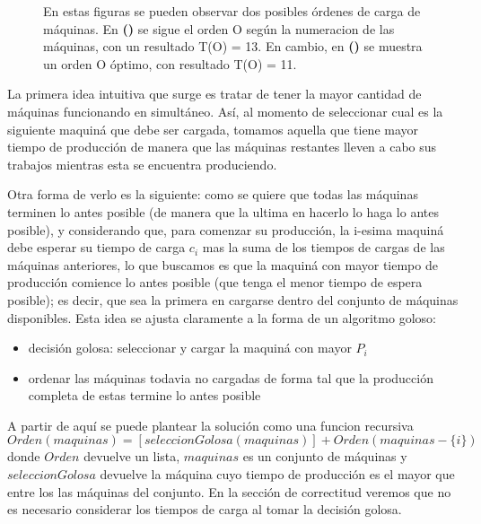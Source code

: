 \begin{figure}
\begin{center}
\begin{minipage}[c]{\figurewidth}
\begin{center}
             \caption{En estas figuras se pueden observar dos posibles \'ordenes de carga de m\'aquinas. En \textbf{()} se
             					sigue el orden O seg\'un la numeracion de las m\'aquinas, con un resultado T(O) = 13. En cambio, en \textbf{()} 
             					se muestra un orden O \'optimo, con resultado T(O) = 11.
             					}   
             \label{fig:ej1Ejemplos}
            \end{center}
        \end{minipage}
    \end{center}
\end{figure}
 
 
La primera idea intuitiva que surge es tratar de tener la mayor cantidad de m\'aquinas funcionando en simult\'aneo.
As\'i, al momento de seleccionar cual es la siguiente maquin\'a que debe ser cargada, 
tomamos aquella que tiene mayor tiempo de producci\'on de manera
que las m\'aquinas restantes lleven a cabo sus trabajos mientras esta se encuentra produciendo.

Otra forma de verlo es la siguiente: como se quiere que todas las m\'aquinas terminen lo antes posible (de manera que la ultima en hacerlo lo haga lo antes posible), y considerando
que, para comenzar su producci\'on, la i-esima maquin\'a debe esperar su tiempo de carga $c_i$ mas la suma de los tiempos de cargas de las m\'aquinas anteriores,
lo que buscamos es que la maquin\'a con mayor tiempo de producci\'on comience lo antes posible (que tenga el menor tiempo de espera posible); es decir, que sea la primera en cargarse dentro del conjunto de m\'aquinas disponibles. Esta idea se ajusta claramente a la forma de un algoritmo goloso:
\begin{itemize}
	\item decisi\'on golosa: seleccionar y cargar la maquin\'a con mayor $P_i$
	\item ordenar las m\'aquinas todavia no cargadas de forma tal que la producci\'on completa de estas termine lo antes posible
\end{itemize}
A partir de aqu\'i se puede plantear la soluci\'on como una funcion recursiva
$$ Orden(maquinas) = [seleccionGolosa(maquinas)] + Orden(maquinas - \{i\})$$
donde $Orden$ devuelve un lista, $maquinas$ es un conjunto de m\'aquinas y $seleccionGolosa$ devuelve la m\'aquina cuyo tiempo de producci\'on es el mayor que entre los  las m\'aquinas del conjunto. En la secci\'on de correctitud veremos que  no es necesario considerar los tiempos de carga al tomar la decisi\'on golosa.

